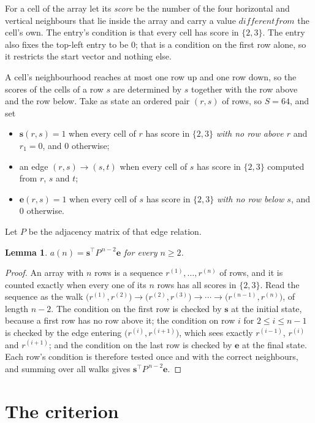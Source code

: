 \documentclass[11pt,a4paper]{article}
\theoremstyle{plain}
\newtheorem{lemma}[theorem]{Lemma}
\theoremstyle{definition}
\begin{document}
For a cell of the array let its \emph{score} be the number of the four horizontal and vertical neighbours that lie inside
the array and carry a value $different from$ the cell's own. The entry's condition is that every cell
has score in $\{2,3\}$. The entry also fixes the top-left entry to be $0$; that is a condition on the first row alone, so it restricts the start vector and nothing else.

A cell's neighbourhood reaches at most one row up and one row down, so the scores of the
cells of a row $s$ are determined by $s$ together with the row above and the row below.
Take as state an ordered pair $(r,s)$ of rows, so $S=64$, and set
\begin{itemize}
\item $\mathbf{s}(r,s)=1$ when every cell of $r$ has score in $\{2,3\}$ \emph{with no row
above $r$} and $r_1=0$, and $0$ otherwise;
\item an edge $(r,s)\to(s,t)$ when every cell of $s$ has score in $\{2,3\}$ computed from
$r$, $s$ and $t$;
\item $\mathbf{e}(r,s)=1$ when every cell of $s$ has score in $\{2,3\}$ \emph{with no row
below $s$}, and $0$ otherwise.
\end{itemize}
Let $P$ be the adjacency matrix of that edge relation.

\begin{lemma}\label{lem:walk}
$a(n)=\mathbf{s}^{\!\top}P^{\,n-2}\mathbf{e}$ for every $n\ge2$.
\end{lemma}

\begin{proof}
An array with $n$ rows is a sequence $r^{(1)},\dots,r^{(n)}$ of rows, and it is counted
exactly when every one of its $n$ rows has all scores in $\{2,3\}$. Read the sequence as the
walk $\bigl(r^{(1)},r^{(2)}\bigr)\to\bigl(r^{(2)},r^{(3)}\bigr)\to\cdots\to
\bigl(r^{(n-1)},r^{(n)}\bigr)$, of length $n-2$. The condition on the first row is
checked by $\mathbf{s}$ at the initial state, because a first row has no row above it; the
condition on row $i$ for $2\le i\le n-1$ is checked by the edge entering
$\bigl(r^{(i)},r^{(i+1)}\bigr)$, which sees exactly $r^{(i-1)}$, $r^{(i)}$ and
$r^{(i+1)}$; and the condition on the last row is checked by $\mathbf{e}$ at the final
state. Each row's condition is therefore tested once and with the correct neighbours, and
summing over all walks gives $\mathbf{s}^{\!\top}P^{\,n-2}\mathbf{e}$.
\end{proof}

\section{The criterion}
\end{document}
